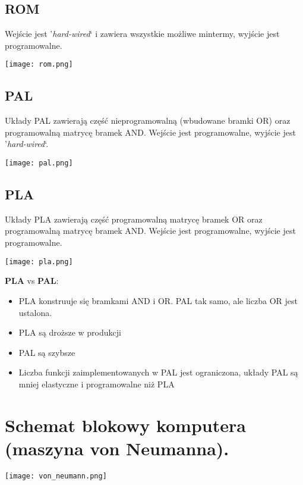 \documentclass[main.tex]{subfiles}
\begin{document}
    \subsection{ROM}
    Wejście jest '\textit{hard-wired}` i zawiera wszystkie możliwe mintermy, wyjście jest programowalne.
    \begin{center}
        \texttt{[image: rom.png]}
    \end{center}

    \subsection{PAL}
    Układy PAL zawierają część nieprogramowalną (wbudowane bramki OR) oraz programowalną
    matrycę bramek AND.
    Wejście jest programowalne, wyjście jest '\textit{hard-wired}`.
    \begin{center}
        \texttt{[image: pal.png]}
    \end{center}

    \subsection{PLA}
    Układy PLA zawierają część programowalną matrycę bramek OR oraz programowalną
    matrycę bramek AND.
    Wejście jest programowalne, wyjście jest programowalne.
    \begin{center}
        \texttt{[image: pla.png]}
    \end{center}

    \textbf{PLA} vs \textbf{PAL}:
    \begin{itemize}
        \item PLA konstruuje się bramkami AND i OR. PAL tak samo, ale liczba
        OR jest ustalona.
        \item PLA są droższe w produkcji
        \item PAL są szybsze
        \item Liczba funkcji zaimplementowanych w PAL jest ograniczona,
        układy PAL są mniej elastyczne i programowalne niż PLA
    \end{itemize}
    \newpage

    \section{Schemat blokowy komputera (maszyna von Neumanna).}

    \begin{center}
        \texttt{[image: von\_neumann.png]}
    \end{center}
\end{document}
